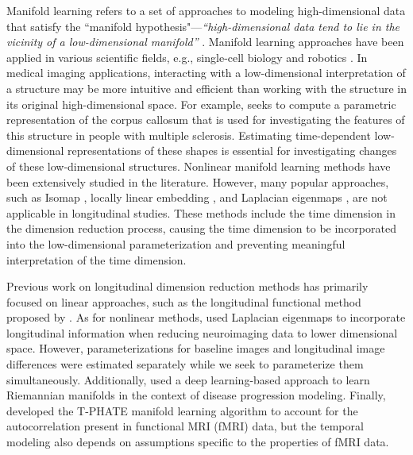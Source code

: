 \documentclass[12pt]{article}
\theoremstyle{definition}
\begin{document}
Manifold learning refers to a set of approaches to modeling high-dimensional data that satisfy the ``manifold hypothesis"---\textit{``high-dimensional data tend to lie in the vicinity of a low-dimensional manifold''} \citep{fefferman2016testing}. Manifold learning approaches have been applied in various scientific fields, e.g., single-cell biology \citep{ding2023learning} and robotics \citep{gao2023k}. In medical imaging applications, interacting with a low-dimensional interpretation of a structure may be more intuitive and efficient than working with the structure in its original high-dimensional space. For example, \cite{yue2016Parameterization} seeks to compute a parametric representation of the corpus callosum that is used for investigating the features of this structure in people with multiple sclerosis. Estimating time-dependent low-dimensional representations of these shapes is essential for investigating changes of these low-dimensional structures. Nonlinear manifold learning methods have been extensively studied in the literature. However, many popular approaches, such as Isomap \citep{tenenbaum2000Global}, locally linear embedding \citep{roweis2000Nonlinear}, and Laplacian eigenmaps \citep{belkin2003laplacian}, are not applicable in longitudinal studies. These methods include the time dimension in the dimension reduction process, causing the time dimension to be incorporated into the low-dimensional parameterization and preventing meaningful interpretation of the time dimension.

Previous work on longitudinal dimension reduction methods has primarily focused on linear approaches, such as the longitudinal functional  method proposed by \cite{greven2011longitudinal}. As for nonlinear methods, \cite{wolz2010Manifold} used Laplacian eigenmaps to incorporate longitudinal information when reducing neuroimaging data to lower dimensional space. However, parameterizations for baseline images and longitudinal image differences were estimated separately while we seek to parameterize them simultaneously. Additionally, \cite{louis2019Riemannian} used a deep learning-based approach to learn Riemannian manifolds in the context of disease progression modeling.  Finally, \cite{busch2023Multiview} developed the T-PHATE manifold learning algorithm to account for the autocorrelation present in functional MRI (fMRI) data, but the temporal modeling also depends on assumptions specific to the properties of fMRI data.
\end{document}
